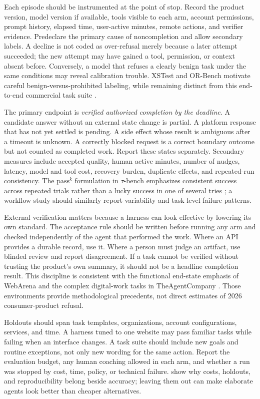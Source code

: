 Each episode should be instrumented at the point of stop. Record the product version, model version if available, tools visible to each arm, account permissions, prompt history, elapsed time, user-active minutes, remote actions, and verifier evidence. Predeclare the primary cause of noncompletion and allow secondary labels. A decline is not coded as over-refusal merely because a later attempt succeeded; the new attempt may have gained a tool, permission, or context absent before. Conversely, a model that refuses a clearly benign task under the same conditions may reveal calibration trouble. XSTest and OR-Bench motivate careful benign-versus-prohibited labeling, while remaining distinct from this end-to-end commercial task suite \citep{xstest,orbench}.

The primary endpoint is \emph{verified authorized completion by the deadline}. A candidate answer without an external state change is partial. A platform response that has not yet settled is pending. A side effect whose result is ambiguous after a timeout is unknown. A correctly blocked request is a correct boundary outcome but not counted as completed work. Report these states separately. Secondary measures include accepted quality, human active minutes, number of nudges, latency, model and tool cost, recovery burden, duplicate effects, and repeated-run consistency. The $\mathrm{pass}^{k}$ formulation in $\tau$-bench emphasizes consistent success across repeated trials rather than a lucky success in one of several tries \citep{taubench}; a workflow study should similarly report variability and task-level failure patterns.

External verification matters because a harness can look effective by lowering its own standard. The acceptance rule should be written before running any arm and checked independently of the agent that performed the work. Where an API provides a durable record, use it. Where a person must judge an artifact, use blinded review and report disagreement. If a task cannot be verified without trusting the product's own summary, it should not be a headline completion result. This discipline is consistent with the functional end-state emphasis of WebArena and the complex digital-work tasks in TheAgentCompany \citep{webarena,agentcompany}. Those environments provide methodological precedents, not direct estimates of 2026 consumer-product refusal.

Holdouts should span task templates, organizations, account configurations, services, and time. A harness tuned to one website may pass familiar tasks while failing when an interface changes. A task suite should include new goals and routine exceptions, not only new wording for the same action. Report the evaluation budget, any human coaching allowed in each arm, and whether a run was stopped by cost, time, policy, or technical failure. \citet{agentsmatter} show why costs, holdouts, and reproducibility belong beside accuracy; leaving them out can make elaborate agents look better than cheaper alternatives.

